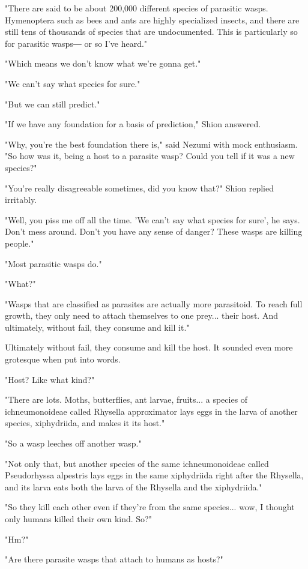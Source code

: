 "There are said to be about 200,000 different species of parasitic
wasps. Hymenoptera such as bees and ants are highly specialized insects,
and there are still tens of thousands of species that are undocumented.
This is particularly so for parasitic wasps― or so I've heard."

"Which means we don't know what we're gonna get."

"We can't say what species for sure."

"But we can still predict."

"If we have any foundation for a basis of prediction," Shion answered.

"Why, you're the best foundation there is," said Nezumi with mock
enthusiasm. "So how was it, being a host to a parasite wasp? Could you
tell if it was a new species?"

"You're really disagreeable sometimes, did you know that?" Shion replied
irritably.

"Well, you piss me off all the time. 'We can't say what species for
sure', he says. Don't mess around. Don't you have any sense of danger?
These wasps are killing people."

"Most parasitic wasps do."

"What?"

"Wasps that are classified as parasites are actually more parasitoid. To
reach full growth, they only need to attach themselves to one prey...
their host. And ultimately, without fail, they consume and kill it."

Ultimately without fail, they consume and kill the host. It sounded even
more grotesque when put into words.

"Host? Like what kind?"

"There are lots. Moths, butterflies, ant larvae, fruits... a species of
ichneumonoideae called Rhysella approximator lays eggs in the larva of
another species, xiphydriida, and makes it its host."

"So a wasp leeches off another wasp."

"Not only that, but another species of the same ichneumonoideae called
Pseudorhyssa alpestris lays eggs in the same xiphydriida right after the
Rhysella, and its larva eats both the larva of the Rhysella and the
xiphydriida."

"So they kill each other even if they're from the same species... wow, I
thought only humans killed their own kind. So?"

"Hm?"

"Are there parasite wasps that attach to humans as hosts?"

